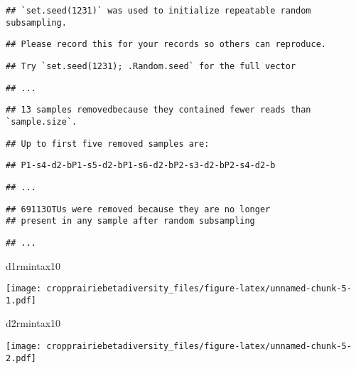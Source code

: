 \documentclass[
]{article}
\newenvironment{Shaded}{\begin{snugshade}}{\end{snugshade}}
\newcommand{\NormalTok}[1]{#1}
\begin{document}
\begin{verbatim}
## `set.seed(1231)` was used to initialize repeatable random subsampling.
\end{verbatim}

\begin{verbatim}
## Please record this for your records so others can reproduce.
\end{verbatim}

\begin{verbatim}
## Try `set.seed(1231); .Random.seed` for the full vector
\end{verbatim}

\begin{verbatim}
## ...
\end{verbatim}

\begin{verbatim}
## 13 samples removedbecause they contained fewer reads than `sample.size`.
\end{verbatim}

\begin{verbatim}
## Up to first five removed samples are:
\end{verbatim}

\begin{verbatim}
## P1-s4-d2-bP1-s5-d2-bP1-s6-d2-bP2-s3-d2-bP2-s4-d2-b
\end{verbatim}

\begin{verbatim}
## ...
\end{verbatim}

\begin{verbatim}
## 69113OTUs were removed because they are no longer 
## present in any sample after random subsampling
\end{verbatim}

\begin{verbatim}
## ...
\end{verbatim}

\begin{Shaded}
\begin{Highlighting}[]
\NormalTok{d1rmintax10}
\end{Highlighting}
\end{Shaded}

\texttt{[image: cropprairiebetadiversity\_files/figure-latex/unnamed-chunk-5-1.pdf]}

\begin{Shaded}
\begin{Highlighting}[]
\NormalTok{d2rmintax10}
\end{Highlighting}
\end{Shaded}

\texttt{[image: cropprairiebetadiversity\_files/figure-latex/unnamed-chunk-5-2.pdf]}
\end{document}
